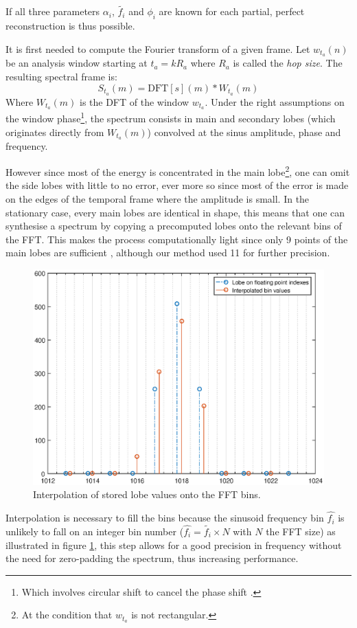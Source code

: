 \documentclass[]{article}
\begin{document}
If all three parameters $\alpha_i$, $\tilde{f_i}$ and $\phi_{i}$ are known for each partial, perfect reconstruction is thus possible.

It is first needed to compute the Fourier transform of a given frame. Let $w_{t_a}(n)$ be an analysis window starting at $t_a = kR_a$ where $R_a$ is called the \emph{hop size}. The resulting spectral frame is:
\begin{equation}
S_{t_a}(m) = \text{DFT}[s](m) \ast W_{t_a}(m)
\end{equation}
Where $W_{t_a}(m)$ is the DFT of the window $w_{t_a}$. Under the right assumptions on the window phase\footnote{Which involves circular shift to cancel the phase shift \cite{arfib2002time}.}, the spectrum consists in main and secondary lobes (which originates directly from $W_{t_a}(m)$) convolved at the sinus amplitude, phase and frequency.

However since most of the energy is concentrated in the main lobe\footnote{At the condition that $w_{t_a}$ is not rectangular.}, one can omit the side lobes with little to no error, ever more so since most of the error is made on the edges of the temporal frame where the amplitude is small. In the stationary case, every main lobes are identical in shape, this means that one can synthesise a spectrum by copying a precomputed lobes onto the relevant bins of the FFT. This makes the process computationally light since only 9 points of the main lobes are sufficient \cite{rodet1992spectral}, although our method used 11 for further precision.

\begin{figure}
	\centering
	\includegraphics[scale=0.4]{Interpolation.eps}
	\caption{ Interpolation of stored lobe values onto the FFT bins.}
	\label{interpBin}
\end{figure}
Interpolation is necessary to fill the bins because the sinusoid frequency bin $\hat{f_i}$ is unlikely to fall on an integer bin number ($\hat{f_i} = \tilde{f_i}\times N$ with $N$ the FFT size) as illustrated in figure \ref{interpBin}, this step allows for a good precision in frequency without the need for zero-padding the spectrum, thus increasing performance.
\end{document}

